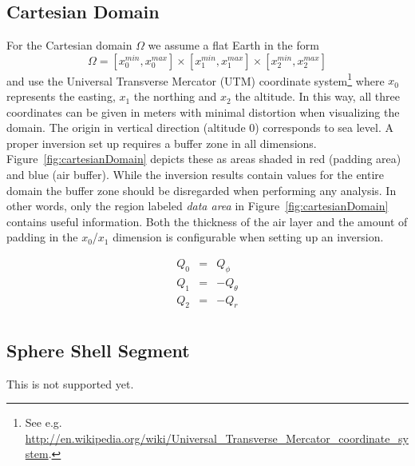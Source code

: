 \subsection{Cartesian Domain}
For the Cartesian domain $\Omega$ we assume a flat Earth in the form
\begin{equation} \label{REF:EQU:INTRO 8}
\Omega = [x^{min}_0, x^{max}_0] \times
 [x^{min}_1, x^{max}_1] \times
 [x^{min}_2, x^{max}_2] 
\end{equation} 
and use the Universal Transverse Mercator (UTM) coordinate system\footnote{See
    e.g. \url{http://en.wikipedia.org/wiki/Universal_Transverse_Mercator_coordinate_system}.}
where $x_0$ represents the easting, $x_1$ the northing and $x_2$ the altitude.
In this way, all three coordinates can be given in meters with minimal
distortion when visualizing the domain.
The origin in vertical direction (altitude 0) corresponds to sea level.
A proper inversion set up requires a buffer zone in all dimensions.
Figure~\ref{fig:cartesianDomain} depicts these as areas shaded in red (padding
area) and blue (air buffer).
While the inversion results contain values for the entire domain the buffer zone
should be disregarded when performing any analysis.
In other words, only the region labeled \emph{data area} in
Figure~\ref{fig:cartesianDomain} contains useful information.
Both the thickness of the air layer and the amount of padding in the $x_0$/$x_1$
dimension is configurable when setting up an inversion.



\begin{equation}\label{REF:EQU:INTRO 9}
\begin{array}{rcl}
Q_0  & = &  Q_{\phi} \\
Q_1  & = & -Q_{\theta} \\
Q_2  & = & -Q_r \\
\end{array}
\end{equation}

\subsection{Sphere Shell Segment}
This is not supported yet.













 
